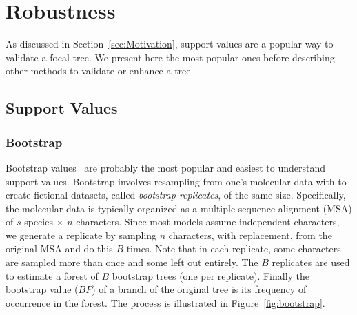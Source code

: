 \section{Robustness} \label{sec:robustness}

As discussed in Section~\ref{sec:Motivation}, support values are a popular way to validate a focal tree. We present here the most popular ones before describing other methods to validate or enhance a tree. 

\subsection{Support Values} \label{sec:confidence-values}

\subsubsection{Bootstrap} \label{sec:bootstrap}

Bootstrap values~\cite{Felsenstein1985} are probably the most popular and easiest to understand support values. Bootstrap involves resampling from one's molecular data with to create fictional datasets, called \emph{bootstrap replicates}, of the same size. Specifically, the molecular data is typically organized as a multiple sequence alignment (MSA) of $s$ species $\times$ $n$ characters. Since most models assume independent characters, we generate a replicate by sampling $n$ characters, with replacement, from the original MSA and do this $B$ times. Note that in each replicate, some characters are sampled more than once and some left out entirely. The $B$ replicates are used to estimate a forest of $B$ bootstrap trees (one per replicate). Finally the bootstrap value ($BP$) of a branch of the original tree is its frequency of occurrence in the forest. The process is illustrated in Figure~\ref{fig:bootstrap}. 

